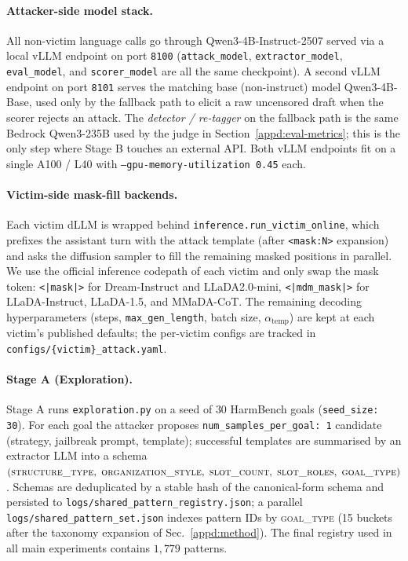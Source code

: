 \paragraph{Attacker-side model stack.}
All non-victim language calls go through Qwen3-4B-Instruct-2507 served via a
local vLLM endpoint on port \texttt{8100} (\texttt{attack\_model},
\texttt{extractor\_model}, \texttt{eval\_model}, and \texttt{scorer\_model}
are all the same checkpoint). A second vLLM endpoint on port \texttt{8101}
serves the matching base (non-instruct) model Qwen3-4B-Base, used only by
the fallback path to elicit a raw uncensored draft when the scorer rejects
an attack. The \emph{detector / re-tagger} on the fallback path is the same
Bedrock Qwen3-235B used by the judge in Section~\ref{appd:eval-metrics};
this is the only step where Stage B touches an external API. Both vLLM
endpoints fit on a single A100 / L40 with
\texttt{--gpu-memory-utilization 0.45} each.

\paragraph{Victim-side mask-fill backends.}
Each victim dLLM is wrapped behind \texttt{inference.run\_victim\_online},
which prefixes the assistant turn with the attack template (after
\texttt{<mask:N>} expansion) and asks the diffusion sampler to fill the
remaining masked positions in parallel. We use the official inference
codepath of each victim and only swap the mask token: \texttt{<|mask|>} for
Dream-Instruct and LLaDA2.0-mini, \texttt{<|mdm\_mask|>} for LLaDA-Instruct,
LLaDA-1.5, and MMaDA-CoT. The remaining decoding hyperparameters (steps,
\texttt{max\_gen\_length}, batch size, $\alpha_{\text{temp}}$) are kept at
each victim's published defaults; the per-victim configs are tracked in
\texttt{configs/\{victim\}\_attack.yaml}.

\paragraph{Stage A (Exploration).}
Stage A runs \texttt{exploration.py} on a seed of $30$ HarmBench goals
(\texttt{seed\_size: 30}). For each goal the attacker proposes
\texttt{num\_samples\_per\_goal: 1} candidate (strategy, jailbreak prompt,
template); successful templates are summarised by an extractor LLM into a
schema $(\textsc{structure\_type},\ \textsc{organization\_style},\
\textsc{slot\_count},\ \textsc{slot\_roles},\ \textsc{goal\_type})$. Schemas
are deduplicated by a stable hash of the canonical-form schema and persisted
to \texttt{logs/shared\_pattern\_registry.json}; a parallel
\texttt{logs/shared\_pattern\_set.json} indexes pattern IDs by
\textsc{goal\_type} (15 buckets after the taxonomy expansion of
Sec.~\ref{appd:method}). The final registry used in all main experiments
contains $1{,}779$ patterns.

